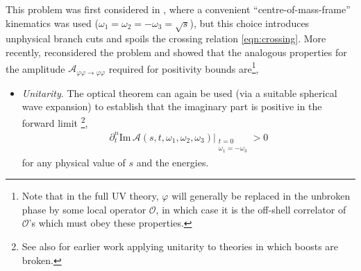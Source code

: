 \documentclass[11pt]{article}
\begin{document}
This problem was first considered in \cite{Baumann:2015nta}, where a convenient ``centre-of-mass-frame'' kinematics was used ($\omega_1 = \omega_2 = - \omega_3 = \sqrt{s}$), but this choice introduces unphysical branch cuts and spoils the crossing relation \eqref{eqn:crossing}. 
More recently, \cite{Grall:2021xxm} reconsidered the problem and showed that the analogous properties for the amplitude $\mathcal{A}_{\varphi \varphi \to \varphi \varphi}$ required for positivity bounds are\footnote{
Note that in the full UV theory, $\varphi$ will generally be replaced in the unbroken phase by some local operator $\mathcal{O}$, in which case it is the off-shell correlator of $\mathcal{O}$'s which must obey these properties. 
}, 
\begin{itemize}

\item \emph{Unitarity}. 
The optical theorem can again be used (via a suitable spherical wave expansion) to establish that the imaginary part is positive in the forward limit \cite{Grall:2020tqc}\footnote{
See also \cite{Baumann:2011su, Baumann:2014cja, Koehn:2015vvy, deRham:2017aoj} for earlier work applying unitarity to theories in which boosts are broken. 
},
\begin{align}
\partial_t^n \text{Im} \, \mathcal{A} (s, t, \omega_1 ,\omega_2, \omega_3 ) |_{ \substack{t=0 \\ \omega_1 = - \omega_3} } > 0 
\label{eqn:unitarity2}
\end{align}
for any physical value of $s$ and the energies. 


\end{itemize}
\end{document}
